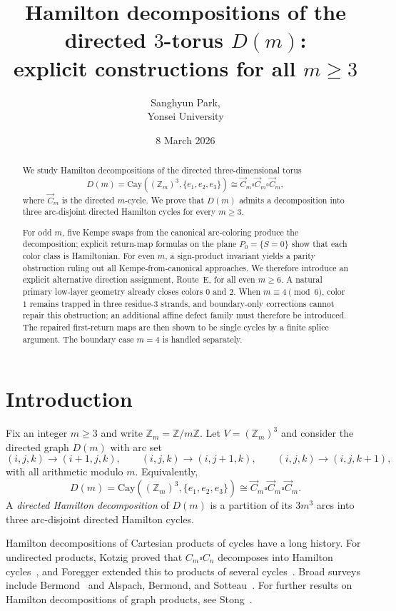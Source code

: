 \documentclass[11pt]{article}
\title{Hamilton decompositions of the directed $3$-torus $D(m)$:\\
explicit constructions for all $m\ge 3$}
\author{Sanghyun Park, \\ Yonsei University}
\date{8 March 2026}
\begin{document}
\maketitle

\begin{abstract}
We study Hamilton decompositions of the directed three-dimensional torus
\[
D(m)=\mathrm{Cay}((\mathbb Z_m)^3,\{e_1,e_2,e_3\})\cong \vec C_m\square \vec C_m\square \vec C_m,
\]
where $\vec C_m$ is the directed $m$-cycle.
We prove that $D(m)$ admits a decomposition into three arc-disjoint directed Hamilton cycles for every $m\ge 3$.

For odd $m$, five Kempe swaps from the canonical arc-coloring produce the decomposition;
explicit return-map formulas on the plane $P_0=\{S=0\}$ show that each color class is Hamiltonian.
For even $m$, a sign-product invariant yields a parity obstruction ruling out all Kempe-from-canonical approaches.
We therefore introduce an explicit alternative direction assignment, Route~E, for all even $m\ge 6$.
A natural primary low-layer geometry already closes colors $0$ and $2$.
When $m\equiv 4\pmod 6$, color $1$ remains trapped in three residue-$3$ strands, and boundary-only corrections cannot repair this obstruction;
an additional affine defect family must therefore be introduced.
The repaired first-return maps are then shown to be single cycles by a finite splice argument.
The boundary case $m=4$ is handled separately.
\end{abstract}


\section{Introduction}

Fix an integer $m\ge 3$ and write $\mathbb Z_m=\mathbb Z/m\mathbb Z$.
Let $V=(\mathbb Z_m)^3$ and consider the directed graph $D(m)$ with arc set
\[
(i,j,k)\to(i+1,j,k),\qquad (i,j,k)\to(i,j+1,k),\qquad (i,j,k)\to(i,j,k+1),
\]
with all arithmetic modulo $m$.
Equivalently,
\[
D(m)=\mathrm{Cay}((\mathbb Z_m)^3,\{e_1,e_2,e_3\})\cong \vec C_m\square \vec C_m\square \vec C_m.
\]
A \emph{directed Hamilton decomposition} of $D(m)$ is a partition of its $3m^3$ arcs into three arc-disjoint directed Hamilton cycles.

Hamilton decompositions of Cartesian products of cycles have a long history.
For undirected products, Kotzig proved that $C_m\square C_n$ decomposes into Hamilton cycles~\cite{Kotzig1973}, and Foregger extended this to products of several cycles~\cite{Foregger1978}.
Broad surveys include Bermond~\cite{Bermond1978} and Alspach, Bermond, and Sotteau~\cite{AlspachBermondSotteau1990}.
For further results on Hamilton decompositions of graph products, see Stong~\cite{Stong1991}.
\end{document}

